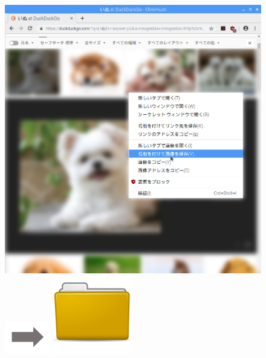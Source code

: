 \begin{figure}[t]
    \begin{minipage}{0.4\textwidth}
      \includegraphics[width=\linewidth]{text01-img/textbook-img092.png}
    \end{minipage}
    \includegraphics[width=2cm]{text01-img/textbook-img073.png}
    \begin{minipage}{0.4\textwidth}
      \includegraphics[width=0.5\linewidth]{text01-img/textbook-img044.png}
    \end{minipage}


\end{figure}
